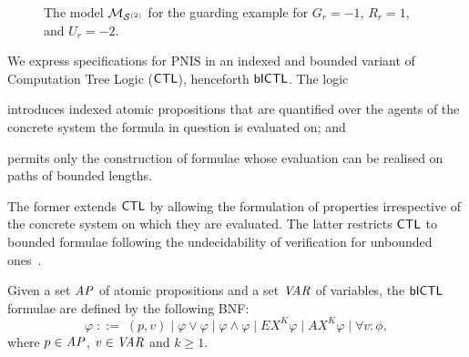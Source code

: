 \begin{example}
\begin{figure}

    \vspace{-0.3cm}
    
    \caption{The model $\mathcal{M}_{\mathcal{S}^{(2)}}$ for the guarding example for $G_r=-1$, $R_r=1$,
      and $U_r=-2$.}
    \label{fig:model-guarding}
  \end{figure}
\end{example}


We express specifications for PNIS in an indexed and bounded variant of
Computation Tree Logic ($\sf{CTL}$), henceforth $\sf{bICTL}$. The logic
\begin{inparaenum}[\it (i)]
\item introduces indexed atomic propositions that are quantified over the
  agents of the concrete system the formula in question is evaluated on; and
\item permits only the construction of formulae whose evaluation can be
  realised on paths of bounded lengths.
\end{inparaenum}
The former extends $\sf{CTL}$ by allowing the formulation of properties
irrespective of the concrete system on which they are evaluated.  The latter
restricts $\sf{CTL}$ to bounded formulae following the undecidability of
verification for unbounded ones~\cite{Akintunde+20}.

\begin{definition}
Given a  set $\it{AP}$ of atomic propositions and a set $\it{VAR}$ of variables,
the $\sf{bICTL}$  formulae are defined by the following BNF:
\[
  \varphi \;   ::= \; (p, v) \mid \varphi \lor \varphi \mid \varphi \land \varphi
  \mid EX^K \varphi \mid AX^K \varphi \mid \forall v \colon \phi,
\]
where  $p \in \it{AP}$, $v \in \it{VAR}$ and $k \geq  1$.
\end{definition}


